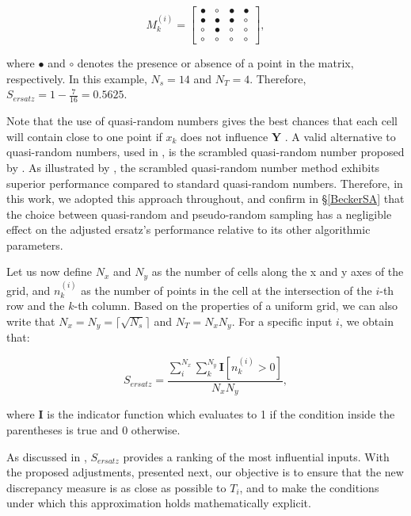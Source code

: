 \documentclass[12pt]{article}
\begin{document}
\begin{equation*}
    M^{(i)}_k =
    \begin{bmatrix}
        \bullet  & \circ   & \bullet & \bullet \\
        \bullet  & \bullet & \bullet & \circ   \\
        \circ    & \bullet & \circ   & \circ   \\
        \circ    & \circ   & \circ   & \circ
    \end{bmatrix},
\end{equation*}

where $\bullet$ and $\circ$ denotes the presence or absence of a point in the matrix, respectively. In this example, $N_s = 14$ and $N_T = 4$. Therefore, $S_{ersatz} = 1 - \frac{7}{16} = 0.5625$.

Note that the use of quasi-random numbers gives the best chances that each cell will contain close to one point if $x_k$ does not influence $\bm{Y}$ \citep{Kucherenko2015}. A valid alternative to quasi-random numbers, used in \cite{puy2024discrepancy}, is the scrambled quasi-random number proposed by \cite{owen1995randomly}. As illustrated by \cite{kucherenko2023importance}, the scrambled quasi-random number method exhibits superior performance compared to standard quasi-random numbers. Therefore, in this work, we adopted this approach throughout, and confirm in \S\ref{BeckerSA} that the choice between quasi-random and pseudo-random sampling has a negligible effect on the adjusted ersatz's performance relative to its other algorithmic parameters.

Let us now define $N_x$ and $N_y$ as the number of cells along the x and y axes of the grid, and $n_k^{(i)}$ as the number of points in the cell at the intersection of the $i$-th row and the $k$-th column. Based on the properties of a uniform grid, we can also write that $N_x=N_y=\lceil\sqrt{N_s}\rceil$ and $N_T=N_xN_y$. For a specific input $i$, we obtain that:

\begin{equation*}
    S_{ersatz}=\frac{\sum\limits_i^{N_x}\sum\limits_k^{N_y}\bm{I}[n_k^{(i)}>0]}{N_xN_y},
\end{equation*}

where $\bm{I}$ is the indicator function which evaluates to 1 if the condition inside the parentheses is true and 0 otherwise.

As discussed in \citet{puy2024discrepancy}, $S_{ersatz}$ provides a ranking of the most influential inputs. With the proposed adjustments, presented next, our objective is to ensure that the new discrepancy measure is as close as possible to $T_i$, and to make the conditions under which this approximation holds mathematically explicit.
\end{document}
